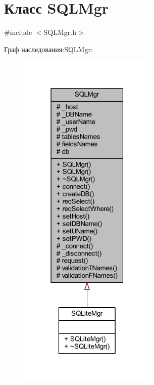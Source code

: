 \hypertarget{class_s_q_l_mgr}{}\section{Класс S\+Q\+L\+Mgr}
\label{class_s_q_l_mgr}


{\ttfamily \#include $<$S\+Q\+L\+Mgr.\+h$>$}



Граф наследования\+:S\+Q\+L\+Mgr\+:\nopagebreak
\begin{figure}[H]
\begin{center}
\leavevmode
\includegraphics[width=187pt]{df/dc9/class_s_q_l_mgr__inherit__graph}
\end{center}
\end{figure}


